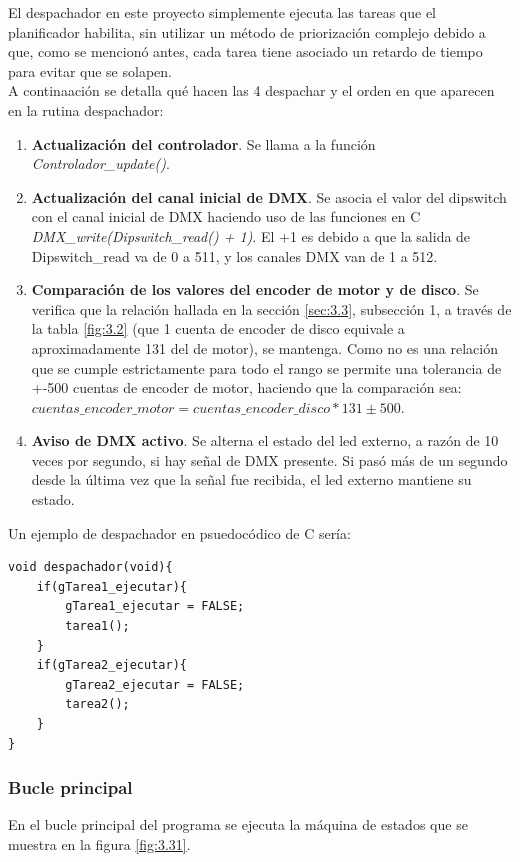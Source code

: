 El despachador en este proyecto simplemente ejecuta las tareas que el planificador habilita, sin utilizar un método de priorización complejo debido a que, como se mencionó antes, cada tarea tiene asociado un retardo de tiempo para evitar que se solapen.\\
A continaación se detalla qué hacen las 4 despachar y el orden en que aparecen en la rutina despachador:
\begin{enumerate}
	\item \textbf{Actualización del controlador}. Se llama a la función \textit{Controlador\_update()}.
	\item \textbf{Actualización del canal inicial de DMX}. Se asocia el valor del dipswitch con el canal inicial de DMX haciendo uso de las funciones en C \textit{DMX\_write(Dipswitch\_read() + 1)}. El +1 es debido a que la salida de Dipswitch\_read va de 0 a 511, y los canales DMX van de 1 a 512.
	\item \textbf{Comparación de los valores del encoder de motor y de disco}. Se verifica que la relación hallada en la sección \ref{sec:3.3}, subsección 1, a través de la tabla \ref{fig:3.2} (que 1 cuenta de encoder de disco equivale a aproximadamente 131 del de motor), se mantenga. Como no es una relación que se cumple estrictamente para todo el rango se permite una tolerancia de +-500 cuentas de encoder de motor, haciendo que la comparación sea: \( cuentas\_encoder\_motor = cuentas\_encoder\_disco*131 \pm 500 \).
	\item \textbf{Aviso de DMX activo}. Se alterna el estado del led externo, a razón de 10 veces por segundo, si hay señal de DMX presente. Si pasó más de un segundo desde la última vez que la señal fue recibida, el led externo mantiene su estado.
\end{enumerate}
Un ejemplo de despachador en psuedocódico de C sería:
\begin{lstlisting}[style=CStyle]
void despachador(void){
	if(gTarea1_ejecutar){
		gTarea1_ejecutar = FALSE;
		tarea1();
	}
	if(gTarea2_ejecutar){
		gTarea2_ejecutar = FALSE;
		tarea2();
	}
}
\end{lstlisting}


\subsubsection{Bucle principal}
En el bucle principal del programa se ejecuta la máquina de estados que se muestra en la figura \ref{fig:3.31}. 

